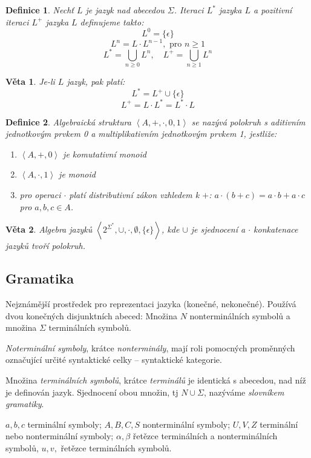 \documentclass[a4paper, 11pt]{report}
\newtheorem{mydef}{Definice}[chapter]
\newtheorem{veta}{Věta}[chapter]
\begin{document}
\begin{mydef}
Nechť $L$ je jazyk nad abecedou $\Sigma$. \emph{Iteraci} $L^*$ jazyka $L$ a \emph{pozitivní iteraci} $L^+$ jazyka $L$ definujeme takto:
$$L^0 = \{\epsilon\}$$
$$L^n = L \cdot L^{n-1}, \text{ pro } n \geq 1$$
$$L^* = \bigcup\limits_{n \geq 0} L^n, \quad L^+ = \bigcup\limits_{n \geq 1} L^n$$
\end{mydef}

\begin{veta}
Je-li $L$ jazyk, pak platí:
$$L^* = L^+ \cup \{\epsilon\}$$
$$L^+ = L \cdot L^* = L^* \cdot L$$
\end{veta}

\begin{mydef}
Algebraická struktura $\left< A, +, \cdot, 0, 1 \right>$ se nazývá polokruh s aditivním jednotkovým prvkem 0 a multiplikativním jednotkovým prvkem 1, jestliže:
\begin{enumerate}[(1)]
	\item $\left< A, +, 0 \right>$ je komutativní monoid
	\item $\left< A, \cdot, 1 \right>$ je monoid
	\item pro operaci $\cdot$ platí distributivní zákon vzhledem k $+$:
	$ a \cdot (b + c) = a \cdot b + a \cdot c$ pro $a, b, c \in A$.
\end{enumerate}
\end{mydef}

\begin{veta}
Algebra jazyků $\left< 2^{\Sigma^*}, \cup, \cdot, \emptyset, \{\epsilon\} \right>$, kde $\cup$ je sjednocení a $\cdot$ konkatenace jazyků tvoří polokruh.
\end{veta}

\subsection{Gramatika}
Nejznámější prostředek pro reprezentaci jazyka (konečné, nekonečné). Používá dvou konečných disjunktních abeced: Množina $N$ nonterminálních symbolů a množina $\Sigma$ terminálních symbolů.

\emph{Noterminální symboly}, krátce \emph{nonterminály}, mají roli pomocných proměnných označující určité syntaktické celky -- syntaktické kategorie.

Množina \emph{terminálních symbolů}, krátce \emph{terminálů} je identická s abecedou, nad níž je definován jazyk. Sjednocení obou množin, tj $N \cup \Sigma$, nazýváme \emph{slovníkem gramatiky}.

$a, b, c$ terminální symboly; $A, B, C, S$ nonterminální symboly; $U, V, Z$ terminální nebo nonterminální symboly; $\alpha, \beta$ řetězce terminálních a nonterminálních symbolů, $u,v,$ řetězce terminálních symbolů.
\end{document}
